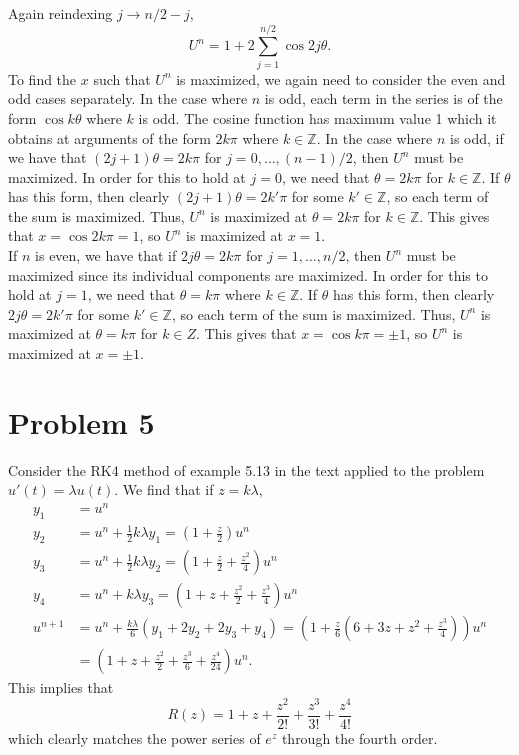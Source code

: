\documentclass{article}
\begin{document}
Again reindexing $j\to n/2-j$,
\[
U^n=1+2\sum_{j=1}^{n/2}\cos2j\theta.
\]
To find the $x$ such that $U^n$ is maximized, we again need to consider the even and odd cases separately. In the case where $n$ is odd, each term in the series is of the form $\cos k\theta$ where $k$ is odd. The cosine function has maximum value 1 which it obtains at arguments of the form $2k\pi$ where $k\in\mathbb{Z}$. In the case where $n$ is odd, if we have  that $(2j+1)\theta=2k\pi$ for $j=0,\ldots,(n-1)/2$, then $U^n$ must be maximized. In order for this to hold at $j=0$, we need that $\theta=2k\pi$ for $k\in \mathbb{Z}$. If $\theta$ has this form, then clearly $(2j+1)\theta=2k'\pi$ for some $k'\in\mathbb{Z}$, so each term of the sum is maximized. Thus, $U^n$ is maximized at $\theta=2k\pi$ for $k\in \mathbb{Z}$. This gives that $x=\cos2k\pi=1$, so $U^n$ is maximized at $x=1$.\\
If $n$ is even, we have  that if $2j\theta=2k\pi$ for $j=1,\ldots,n/2$, then $U^n$ must be maximized since its individual components are maximized. In order for this to hold at $j=1$, we need that $\theta=k\pi$ where $k\in\mathbb{Z}$. If $\theta$ has this form,  then clearly $2j\theta=2k'\pi$ for some $k'\in\mathbb{Z}$, so each term of the sum is maximized. Thus, $U^n$ is maximized at $\theta=k\pi$ for $k\in Z$. This gives that $x=\cos k\pi=\pm1$, so $U^n$ is maximized at $x=\pm1$.

\section{Problem 5}
Consider the RK4 method of example 5.13 in the text applied to the problem $u'(t) = \lambda u(t)$. We find that if $z=k\lambda$,
\begin{align*}
y_1&=u^n\\
y_2&=u^n+\frac{1}{2}k\lambda y_1=\left(1+\frac{z}{2}\right)u^n\\
y_3&=u^n+\frac{1}{2}k\lambda y_2=\left(1+\frac{z}{2}+\frac{z^2}{4}\right)u^n\\
y_4&=u^n+k\lambda y_3=\left(1+z+\frac{z^2}{2}+\frac{z^3}{4}\right)u^n\\
u^{n+1}&=u^n+\frac{k\lambda}{6}\left(y_1+2y_2+2y_3+y_4\right)=\left(1+\frac{z}{6}\left(6+3z+z^2+\frac{z^3}{4}\right)\right)u^n\\&=
\left(1+z+\frac{z^2}{2}+\frac{z^3}{6}+\frac{z^4}{24}\right)u^n.
\end{align*}
This implies that 
\[
R(z)=1+z+\frac{z^2}{2!}+\frac{z^3}{3!}+\frac{z^4}{4!}
\]
which clearly matches the power series of $e^z$ through the fourth order.
\end{document}

